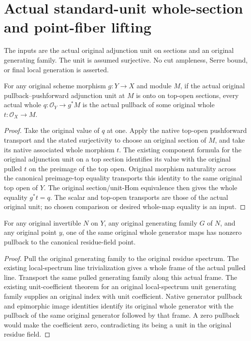 \section{Actual standard-unit whole-section and point-fiber lifting}
The inputs are the actual original adjunction unit on sections and an
original generating family. The unit is assumed surjective. No cut
ampleness, Serre bound, or final local generation is asserted.

\begin{lemma}
\label{lem:original-standard-unit-whole-section-lift}
\leanok
For any original scheme morphism $g:Y\to X$ and module $M$, if the
actual original pullback--pushforward adjunction unit at $M$ is onto on
top-open sections, every actual whole $q:\mathcal O_Y\to g^*M$ is the
actual pullback of some original whole $t:\mathcal O_X\to M$.
\end{lemma}
\begin{proof}
Take the original value of $q$ at one. Apply the native top-open
pushforward transport and the stated surjectivity to choose an original
section of $M$, and take its native associated whole morphism $t$.
The existing component formula for the original adjunction unit on a top
section identifies its value with the original pulled $t$ on the
preimage of the top open. Original morphism naturality across the
canonical preimage-top equality transports this identity to the same
original top open of $Y$. The original section/unit-Hom equivalence
then gives the whole equality $g^*t=q$. The scalar and top-open
transports are those of the actual original unit; no chosen comparison
or desired whole-map equality is an input.
\end{proof}

\begin{lemma}
\label{lem:original-generating-family-nonzero-fiber}
For any original invertible $N$ on $Y$, any original generating family
$G$ of $N$, and any original point $y$, one of the same original whole
generator maps has nonzero pullback to the canonical residue-field point.
\end{lemma}
\begin{proof}
Pull the original generating family to the original residue spectrum.
The existing local-spectrum line trivialization gives a whole frame of
the actual pulled line. Transport the same pulled generating family
along this actual frame. The existing unit-coefficient theorem for an
original local-spectrum unit generating family supplies an original
index with unit coefficient. Native generator pullback and epimorphic
image identities identify its original whole generator with the
pullback of the same original generator followed by that frame.
A zero pullback would make the coefficient zero, contradicting its
being a unit in the original residue field.
\end{proof}

